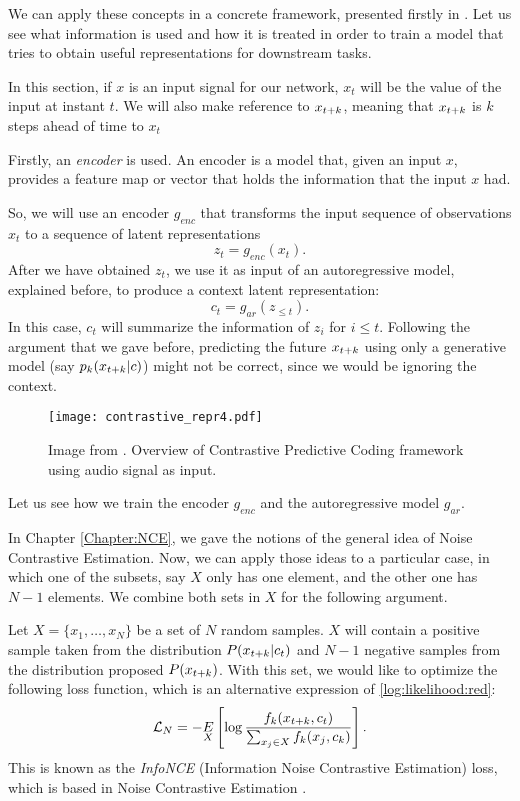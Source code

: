 We can apply these concepts in a concrete framework, presented firstly in \cite{oord_representation_2019}. Let us see what information is used and how it is treated in order to train a model that tries to obtain useful representations for downstream tasks.

In this section, if $x$ is an input signal for our network, $x_t$ will be the value of the input at instant $t$. We will also make reference to $x_{t+k}$, meaning that $x_{t+k}$ is $k$ steps ahead of time to $x_t$

Firstly, an \emph{encoder} is used. An encoder is a model that, given an input $x$, provides a feature map or vector that holds the information that the input $x$ had.

So, we will use an encoder $g_{enc}$ that transforms the input sequence of observations $x_t$ to a sequence of latent representations
$$
z_t = g_{enc}(x_t).
$$
After we have obtained $z_t$, we use it as input of an autoregressive model, explained before, to produce a context latent representation:
$$
c_t = g_{ar}(z_{\leq t}).
$$
In this case, $c_t$ will summarize the information of $z_i$ for $i \leq t$. Following the argument that we gave before, predicting the future $x_{t+k}$ using only a generative model (say $p_k(x_{t+k}|c)$)
might not be correct, since we would be ignoring the context. \\

\begin{figure}[H]
    \centering 
    \texttt{[image: contrastive\_repr4.pdf]}
    \caption{Image from \citep{oord_representation_2019}. Overview of Contrastive Predictive Coding framework using audio signal as input. }
\end{figure}

Let us see how we train the encoder $g_{enc}$ and the autoregressive model $g_{ar}$.

In Chapter \ref{Chapter:NCE}, we gave the notions of the general idea of Noise Contrastive Estimation. Now, we can apply those ideas to a particular case, in which one of the subsets, say $X$ only has one element, and the other one has $N-1$ elements. We combine both sets in $X$ for the following argument.

Let $X = \{x_1,\dots,x_N\}$ be a set of $N$ random samples. $X$ will contain a positive sample taken from the distribution $P( x_{t+k} |c_t)$ and $N-1$ negative
samples from the distribution proposed $P(x_{t+k})$. With this set, we would like to optimize the following loss function, which is an alternative expression of \ref{log:likelihood:red}:
\begin{equation}\label{NCE:loss}
\mathcal L_N = - \underset{X}{E} \left[\log \frac{f_k(x_{t+k},c_t)}{\sum_{x_j \in X} f_k(x_j,c_k)}\right].
\end{equation}
This is known as the \emph{InfoNCE} (Information Noise Contrastive Estimation) loss, which is based in Noise Contrastive Estimation \citep{gutmann_noise-contrastive_nodate}.

